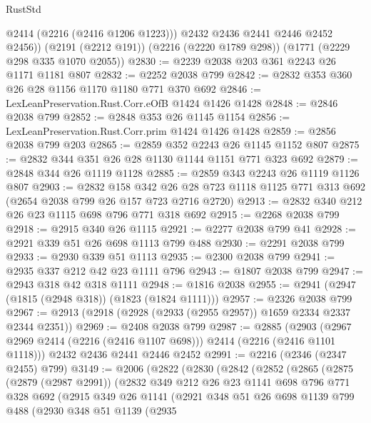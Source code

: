 \begin{lexlean}{RustStd}
\begin{coremodule}
          @2414
          (@2216 (@2416 @1206 @1223)))
        @2432
        @2436
        @2441
        @2446
        @2452
        @2456))
    (@2191 (@2212 @191))
    (@2216 (@2220 @1789 @298))
    (@1771 (@2229 @298 @335 @1070 @2055))
@2830 := @2239 @2038 @203 @361 @2243 @26 @1171 @1181 @807
@2832 := @2252 @2038 @799
@2842 := @2832 @353 @360 @26 @28 @1156 @1170 @1180 @771 @370 @692
@2846 := LexLeanPreservation.Rust.Corr.eOfB @1424 @1426 @1428
@2848 := @2846 @2038 @799
@2852 := @2848 @353 @26 @1145 @1154
@2856 := LexLeanPreservation.Rust.Corr.prim @1424 @1426 @1428
@2859 := @2856 @2038 @799 @203
@2865 := @2859 @352 @2243 @26 @1145 @1152 @807
@2875 := @2832 @344 @351 @26 @28 @1130 @1144 @1151 @771 @323 @692
@2879 := @2848 @344 @26 @1119 @1128
@2885 := @2859 @343 @2243 @26 @1119 @1126 @807
@2903 := @2832
    @158
    @342
    @26
    @28
    @723
    @1118
    @1125
    @771
    @313
    @692
    (@2654 @2038 @799 @26 @157 @723 @2716 @2720)
@2913 := @2832 @340 @212 @26 @23 @1115 @698 @796 @771 @318 @692
@2915 := @2268 @2038 @799
@2918 := @2915 @340 @26 @1115
@2921 := @2277 @2038 @799 @41
@2928 := @2921 @339 @51 @26 @698 @1113 @799 @488
@2930 := @2291 @2038 @799
@2933 := @2930 @339 @51 @1113
@2935 := @2300 @2038 @799
@2941 := @2935 @337 @212 @42 @23 @1111 @796
@2943 := @1807 @2038 @799
@2947 := @2943 @318 @42 @318 @1111
@2948 := @1816 @2038
@2955 := @2941 (@2947 (@1815 (@2948 @318)) (@1823 (@1824 @1111)))
@2957 := @2326 @2038 @799
@2967 := @2913 (@2918 (@2928 (@2933 (@2955 @2957)) @1659 @2334 @2337 @2344 @2351))
@2969 := @2408 @2038 @799
@2987 := @2885
    (@2903 (@2967 @2969 @2414 (@2216 (@2416 @1107 @698))) @2414 (@2216 (@2416 @1101 @1118)))
    @2432
    @2436
    @2441
    @2446
    @2452
@2991 := @2216 (@2346 (@2347 @2455) @799)
@3149 := @2006
    (@2822
      (@2830
        (@2842
          (@2852
            (@2865
              (@2875
                (@2879 (@2987 @2991))
                (@2832
                  @349
                  @212
                  @26
                  @23
                  @1141
                  @698
                  @796
                  @771
                  @328
                  @692
                  (@2915
                    @349
                    @26
                    @1141
                    (@2921
                      @348
                      @51
                      @26
                      @698
                      @1139
                      @799
                      @488
                      (@2930
                        @348
                        @51
                        @1139
                        (@2935

\end{coremodule}
\end{lexlean}
